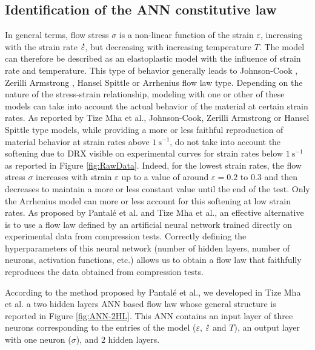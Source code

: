 \documentclass[metals,article,submit,pdftex,moreauthors]{Definitions/mdpi}
\makeatletter
\DeclareRobustCommand{\mdot}[1]{\accentset{\mbox{\bfseries .}}{#1}}
\DeclareRobustCommand{\eal}{et al.\@\xspace}
\DeclareRobustCommand{\ps}{\text{s}^{-1}}
\makeatother
\begin{document}
\subsection{Identification of the ANN constitutive law\label{subsec:ANNConstitutiveLaw}}
In general terms, flow stress $\sigma$ is a non-linear function of the strain $\varepsilon$, increasing with the strain rate $\mdot\varepsilon$, but decreasing with increasing temperature $T$.
The model can therefore be described as an elastoplastic model with the influence of strain rate and temperature.
This type of behavior generally leads to Johnson-Cook \cite{Johnson-1983}, Zerilli Armstrong \cite{Zerilli-1987}, Hansel Spittle \cite{Hensel-1978} or Arrhenius \cite{Sellars-1966} flow law type.
Depending on the nature of the stress-strain relationship, modeling with one or other of these models can take into account the actual behavior of the material at certain strain rates.
As reported by Tize Mha \eal \cite{TizeMha-2023}, Johnson-Cook, Zerilli Armstrong or Hansel Spittle type models, while providing a more or less faithful reproduction of material behavior at strain rates above $1~\ps$, do not take into account the softening due to DRX visible on experimental curves for strain rates below $1~\ps$ as reported in Figure \ref{fig:RawData}.
Indeed, for the lowest strain rates, the flow stress $\sigma$ increases with strain $\varepsilon$ up to a value of around $\varepsilon=0.2$ to $0.3$ and then decreases to maintain a more or less constant value until the end of the test.
Only the Arrhenius model can more or less account for this softening at low strain rates.
As proposed by Pantalé \eal \cite{Pantale-2021, Pantale-2023} and Tize Mha \eal \cite{TizeMha-2023}, an effective alternative is to use a flow law defined by an artificial neural network trained directly on experimental data from compression tests.
Correctly defining the hyperparameters of this neural network (number of hidden layers, number of neurons, activation functions, etc.) allows us to obtain a flow law that faithfully reproduces the data obtained from compression tests.

According to the method proposed by Pantalé \eal \cite{Pantale-2021, Pantale-2023}, we developed in Tize Mha \eal \cite{TizeMha-2023} a two hidden layers ANN based flow law whose general structure is reported in Figure \ref{fig:ANN-2HL}.
This ANN contains an input layer of three neurons corresponding to the entries of the model ($\varepsilon$, $\mdot\varepsilon$ and $T$), an output layer with one neuron ($\sigma$), and $2$ hidden layers.
\end{document}
